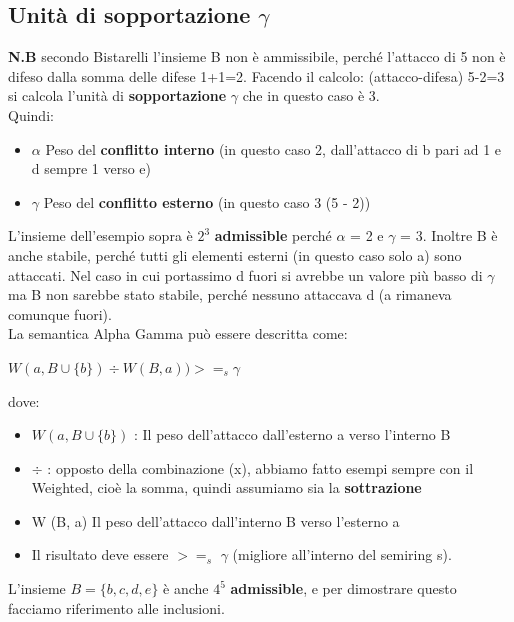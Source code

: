     \subsection{Unità di sopportazione \texorpdfstring{$\gamma$}{gamma}}
    \textbf{N.B} secondo Bistarelli l'insieme B non è ammissibile, perché
    l'attacco di 5 non è difeso dalla somma delle difese 1+1=2. Facendo il
    calcolo: (attacco-difesa) 5-2=3 si calcola l'unità di \textbf{sopportazione}
$\gamma$ che in questo caso è 3. \\Quindi:
    \begin{itemize}
        \item $\alpha$ Peso del \textbf{conflitto interno} (in questo caso 2,
              dall'attacco di b pari ad 1 e d sempre 1 verso e)
        \item $\gamma$ Peso del \textbf{conflitto esterno} (in questo caso 3 (5
              - 2))
    \end{itemize}
    L'insieme dell'esempio sopra è $2^3$ \textbf{admissible} perché $\alpha$ = 2
    e $\gamma$ = 3. Inoltre B è anche stabile, perché tutti gli elementi esterni
    (in questo caso solo a) sono attaccati. Nel caso in cui portassimo d fuori
    si avrebbe un valore più basso di $\gamma$ ma B non sarebbe stato stabile,
    perché nessuno attaccava d (a rimaneva comunque fuori). \\
    La semantica Alpha Gamma può essere descritta come:
    \begin{center}
        $W (a, B \cup \{b\}) \div W (B, a)) >=_s \gamma$
    \end{center}
    dove:
    \begin{itemize}
        \item $W (a, B \cup \{b\})$ : Il peso dell'attacco dall'esterno a verso
              l'interno B
        \item $\div$ : opposto della combinazione (x), abbiamo fatto esempi
              sempre con il Weighted, cioè la somma, quindi assumiamo sia la
              \textbf{sottrazione}
        \item W (B, a) Il peso dell'attacco dall'interno B verso l'esterno a
        \item Il risultato deve essere $>=_s$ $\gamma$ (migliore all'interno del
              semiring s).
    \end{itemize}
    L'insieme $B = \{b, c, d, e\}$ è anche $4^5$ \textbf{admissible}, e per
    dimostrare questo facciamo riferimento alle inclusioni.

